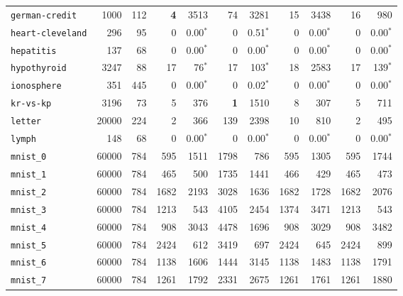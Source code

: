 \begin{tabular}{lccrrrrrrrr}
\texttt{german-credit} & \multicolumn{1}{r}{1000} & \multicolumn{1}{r}{112}  & \textbf{4} & 3513 & 74 & 3281 & 15 & 3438 & 16 & 980\\
\texttt{heart-cleveland} & \multicolumn{1}{r}{296} & \multicolumn{1}{r}{95}  & 0 & 0.00$^*$ & 0 & 0.51$^*$ & 0 & 0.00$^*$ & 0 & 0.00$^*$\\
\texttt{hepatitis} & \multicolumn{1}{r}{137} & \multicolumn{1}{r}{68}  & 0 & 0.00$^*$ & 0 & 0.00$^*$ & 0 & 0.00$^*$ & 0 & 0.00$^*$\\
\texttt{hypothyroid} & \multicolumn{1}{r}{3247} & \multicolumn{1}{r}{88}  & 17 & 76$^*$ & 17 & 103$^*$ & 18 & 2583 & 17 & 139$^*$\\
\texttt{ionosphere} & \multicolumn{1}{r}{351} & \multicolumn{1}{r}{445}  & 0 & 0.00$^*$ & 0 & 0.02$^*$ & 0 & 0.00$^*$ & 0 & 0.00$^*$\\
\texttt{kr-vs-kp} & \multicolumn{1}{r}{3196} & \multicolumn{1}{r}{73}  & 5 & 376 & \textbf{1} & 1510 & 8 & 307 & 5 & 711\\
\texttt{letter} & \multicolumn{1}{r}{20000} & \multicolumn{1}{r}{224}  & 2 & 366 & 139 & 2398 & 10 & 810 & 2 & 495\\
\texttt{lymph} & \multicolumn{1}{r}{148} & \multicolumn{1}{r}{68}  & 0 & 0.00$^*$ & 0 & 0.00$^*$ & 0 & 0.00$^*$ & 0 & 0.00$^*$\\
\texttt{mnist\_0} & \multicolumn{1}{r}{60000} & \multicolumn{1}{r}{784}  & 595 & 1511 & 1798 & 786 & 595 & 1305 & 595 & 1744\\
\texttt{mnist\_1} & \multicolumn{1}{r}{60000} & \multicolumn{1}{r}{784}  & 465 & 500 & 1735 & 1441 & 466 & 429 & 465 & 473\\
\texttt{mnist\_2} & \multicolumn{1}{r}{60000} & \multicolumn{1}{r}{784}  & 1682 & 2193 & 3028 & 1636 & 1682 & 1728 & 1682 & 2076\\
\texttt{mnist\_3} & \multicolumn{1}{r}{60000} & \multicolumn{1}{r}{784}  & 1213 & 543 & 4105 & 2454 & 1374 & 3471 & 1213 & 543\\
\texttt{mnist\_4} & \multicolumn{1}{r}{60000} & \multicolumn{1}{r}{784}  & 908 & 3043 & 4478 & 1696 & 908 & 3029 & 908 & 3482\\
\texttt{mnist\_5} & \multicolumn{1}{r}{60000} & \multicolumn{1}{r}{784}  & 2424 & 612 & 3419 & 697 & 2424 & 645 & 2424 & 899\\
\texttt{mnist\_6} & \multicolumn{1}{r}{60000} & \multicolumn{1}{r}{784}  & 1138 & 1606 & 1444 & 3145 & 1138 & 1483 & 1138 & 1791\\
\texttt{mnist\_7} & \multicolumn{1}{r}{60000} & \multicolumn{1}{r}{784}  & 1261 & 1792 & 2331 & 2675 & 1261 & 1761 & 1261 & 1880\\

\end{tabular}
